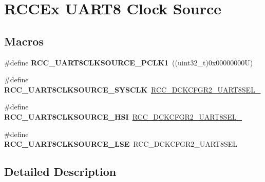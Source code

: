 \hypertarget{group___r_c_c_ex___u_a_r_t8___clock___source}{}\section{R\+C\+C\+Ex U\+A\+R\+T8 Clock Source}
\label{group___r_c_c_ex___u_a_r_t8___clock___source}
\subsection*{Macros}
\begin{DoxyCompactItemize}
\item 
\mbox{\label{group___r_c_c_ex___u_a_r_t8___clock___source_gafde5f45b5bc2cc741f5dbf287db7fc96}} 
\#define {\bfseries R\+C\+C\+\_\+\+U\+A\+R\+T8\+C\+L\+K\+S\+O\+U\+R\+C\+E\+\_\+\+P\+C\+L\+K1}~((uint32\+\_\+t)0x00000000\+U)
\item 
\mbox{\label{group___r_c_c_ex___u_a_r_t8___clock___source_ga4dd061fe7a540902326817dee097dc5a}} 
\#define {\bfseries R\+C\+C\+\_\+\+U\+A\+R\+T8\+C\+L\+K\+S\+O\+U\+R\+C\+E\+\_\+\+S\+Y\+S\+C\+LK}~\mbox{\hyperlink{group___peripheral___registers___bits___definition_ga70475f572824a81deb8c374269b0a865}{R\+C\+C\+\_\+\+D\+C\+K\+C\+F\+G\+R2\+\_\+\+U\+A\+R\+T8\+S\+E\+L\+\_}}
\item 
\mbox{\label{group___r_c_c_ex___u_a_r_t8___clock___source_ga76309a914b9bde64d471c5bc0c227d46}} 
\#define {\bfseries R\+C\+C\+\_\+\+U\+A\+R\+T8\+C\+L\+K\+S\+O\+U\+R\+C\+E\+\_\+\+H\+SI}~\mbox{\hyperlink{group___peripheral___registers___bits___definition_ga3bf6a5631af6b4b67c3157a6ba08b991}{R\+C\+C\+\_\+\+D\+C\+K\+C\+F\+G\+R2\+\_\+\+U\+A\+R\+T8\+S\+E\+L\+\_}}
\item 
\mbox{\label{group___r_c_c_ex___u_a_r_t8___clock___source_gaea73a8609e9c51acce01c6980623bfde}} 
\#define {\bfseries R\+C\+C\+\_\+\+U\+A\+R\+T8\+C\+L\+K\+S\+O\+U\+R\+C\+E\+\_\+\+L\+SE}~R\+C\+C\+\_\+\+D\+C\+K\+C\+F\+G\+R2\+\_\+\+U\+A\+R\+T8\+S\+EL
\end{DoxyCompactItemize}


\subsection{Detailed Description}
